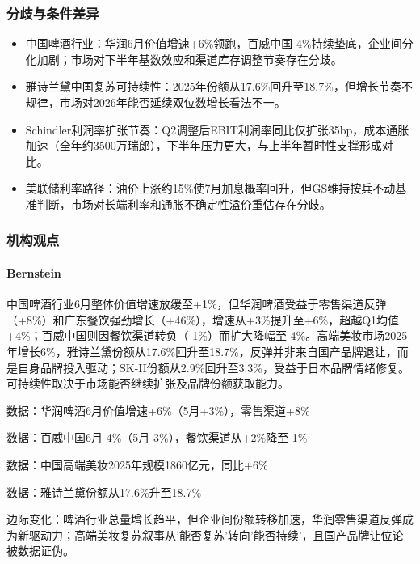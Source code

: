 \documentclass[11pt]{ctexart}
\begin{document}
\subsubsection*{分歧与条件差异}
\begin{itemize}
  \item 中国啤酒行业：华润6月价值增速+6\%领跑，百威中国-4\%持续垫底，企业间分化加剧；市场对下半年基数效应和渠道库存调整节奏存在分歧。
  \item 雅诗兰黛中国复苏可持续性：2025年份额从17.6\%回升至18.7\%，但增长节奏不规律，市场对2026年能否延续双位数增长看法不一。
  \item Schindler利润率扩张节奏：Q2调整后EBIT利润率同比仅扩张35bp，成本通胀加速（全年约3500万瑞郎），下半年压力更大，与上半年暂时性支撑形成对比。
  \item 美联储利率路径：油价上涨约15\%使7月加息概率回升，但GS维持按兵不动基准判断，市场对长端利率和通胀不确定性溢价重估存在分歧。
\end{itemize}
\subsubsection*{机构观点}
\paragraph{Bernstein} 中国啤酒行业6月整体价值增速放缓至+1\%，但华润啤酒受益于零售渠道反弹（+8\%）和广东餐饮强劲增长（+46\%），增速从+3\%提升至+6\%，超越Q1均值+4\%；百威中国则因餐饮渠道转负（-1\%）而扩大降幅至-4\%。高端美妆市场2025年增长6\%，雅诗兰黛份额从17.6\%回升至18.7\%，反弹并非来自国产品牌退让，而是自身品牌投入驱动；SK-II份额从2.9\%回升至3.3\%，受益于日本品牌情绪修复。可持续性取决于市场能否继续扩张及品牌份额获取能力。
{\small\color{refgray}数据：华润啤酒6月价值增速+6\%（5月+3\%），零售渠道+8\%\par}
{\small\color{refgray}数据：百威中国6月-4\%（5月-3\%），餐饮渠道从+2\%降至-1\%\par}
{\small\color{refgray}数据：中国高端美妆2025年规模1860亿元，同比+6\%\par}
{\small\color{refgray}数据：雅诗兰黛份额从17.6\%升至18.7\%\par}
{\small\color{refgray}边际变化：啤酒行业总量增长趋平，但企业间份额转移加速，华润零售渠道反弹成为新驱动力；高端美妆复苏叙事从'能否复苏'转向'能否持续'，且国产品牌让位论被数据证伪。\par}
\end{document}

